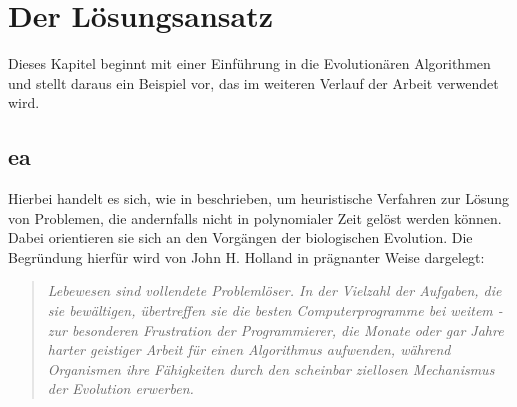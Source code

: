 \chapter{Der Lösungsansatz}
\label{sec:sol}

	Dieses Kapitel beginnt mit einer Einführung in die Evolutionären Algorithmen und stellt daraus ein Beispiel vor, das im weiteren Verlauf der Arbeit verwendet wird.

	\section{\gls{ea}}
	\label{sec:evol}
	
		Hierbei handelt es sich, wie in \cite{ea-intro} beschrieben, um heuristische Verfahren zur Lösung von Problemen, die andernfalls nicht in polynomialer Zeit gelöst werden können. Dabei orientieren sie sich an den Vorgängen der biologischen Evolution. Die Begründung hierfür wird von John H. Holland \cite{j-h-holland} in prägnanter Weise dargelegt: 
	
		\begin{quote}
			\textit{Lebewesen sind vollendete Problemlöser. In der Vielzahl der Aufgaben, die sie bewältigen, übertreffen sie die besten Computerprogramme bei weitem - zur besonderen Frustration der Programmierer, die Monate oder gar Jahre harter geistiger Arbeit für einen Algorithmus aufwenden, während Organismen ihre Fähigkeiten durch den scheinbar ziellosen Mechanismus der Evolution erwerben.}
		\end{quote}
	
